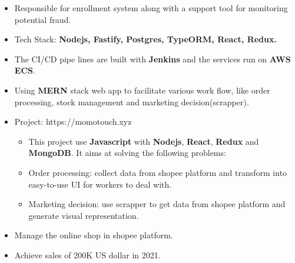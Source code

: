 \documentclass[10pt,a4paper,ragged2e,withhyper]{altacv}
\begin{document}
\begin{paracol}{2}
            \begin{itemize}
                \item Responsible for enrollment system along with a support tool for monitoring potential fraud.
                \item Tech Stack: \textbf{Nodejs, Fastify, Postgres, TypeORM, React, Redux.}
                \item The CI/CD pipe lines are built with \textbf{Jenkins} and the services run on \textbf{AWS ECS}.
            \end{itemize}
            \begin{itemize}
                \item Using \textbf{MERN} stack web app to facilitate various work flow, like order processing, stock management and marketing decision(scrapper).
                \item Project: https://momotouch.xyz
                \begin{itemize}
                    \item This project use \textbf{Javascript} with \textbf{Nodejs}, \textbf{React}, \textbf{Redux} and \textbf{MongoDB}. It aims at solving the following problems:
                    \item {} Order processing: collect data from shopee platform and transform into easy-to-use UI for workers to deal with.
                    \item {} Marketing decision: use scrapper to get data from shopee platform and generate visual representation.
                \end{itemize}
            \end{itemize}
            \divider
            
            \begin{itemize}
                \item Manage the online shop in shopee platform.
                \item Achieve sales of 200K US dollar in 2021.
            \end{itemize}
            \divider
        

\end{paracol}
\end{document}
